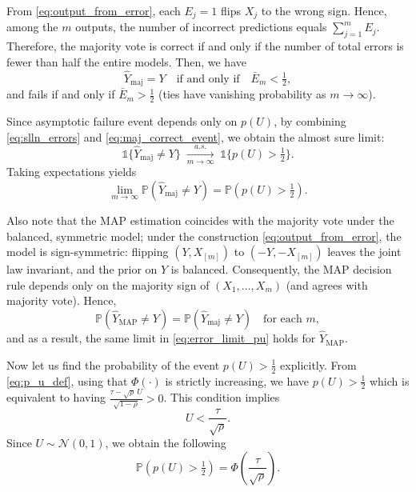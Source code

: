 \documentclass{article}
\theoremstyle{plain}
\theoremstyle{definition}
\theoremstyle{remark}
\begin{document}
From \eqref{eq:output_from_error}, each $E_j=1$ flips $X_j$ to the wrong sign.
Hence, among the $m$ outputs, the number of incorrect predictions equals $\sum_{j=1}^m E_j$.
Therefore, the majority vote is correct
if and only if  the number of total errors is fewer than half the entire models. Then, we have 
\begin{equation}
\label{eq:maj_correct_event}
\hat Y_{\mathrm{maj}} = Y
\quad\text{if and only if}\quad
\bar E_m < \tfrac12,
\end{equation}
and fails if and only if $\bar E_m>\tfrac12$ (ties have vanishing probability as $m\to\infty$).

Since asymptotic failure event depends only on $p(U)$, 
by combining \eqref{eq:slln_errors} and \eqref{eq:maj_correct_event}, we obtain the almost sure limit:
\begin{equation}
\label{eq:maj_limit_indicator}
\mathds{1}\{\hat Y_{\mathrm{maj}}\neq Y\}
\;\xrightarrow[m\to\infty]{a.s.}\;
\mathds{1}\{p(U)>\tfrac12\}.
\end{equation}
Taking expectations yields
\begin{equation}
\label{eq:error_limit_pu}
\lim_{m\to\infty}\mathbb{P}(\hat Y_{\mathrm{maj}}\neq Y)=\mathbb{P}\!\left(p(U)>\tfrac12\right).
\end{equation}

Also note that the MAP estimation coincides with the majority vote under the balanced, symmetric model;
under the construction \eqref{eq:output_from_error}, the model is sign-symmetric:
flipping $(Y,X_{[m]})$ to $(-Y,-X_{[m]})$ leaves the joint law invariant, and the prior on $Y$ is balanced.
Consequently, the MAP decision rule depends only on the majority sign of $(X_1,\dots,X_m)$
(and agrees with majority vote). Hence,
\begin{equation}
\label{eq:map_equals_maj}
\mathbb{P}(\hat Y_{\mathrm{MAP}}\neq Y)=\mathbb{P}(\hat Y_{\mathrm{maj}}\neq Y)\quad\text{for each }m,
\end{equation}
and as a result, the same limit in \eqref{eq:error_limit_pu} holds for $\hat Y_{\mathrm{MAP}}$.

Now let us  find the probability of the event $p(U)>\tfrac12$ explicitly.
From \eqref{eq:p_u_def}, using that $\Phi(\cdot)$ is strictly increasing, we have $p(U)>\tfrac12
$ which is equivalent to having $\frac{\tau-\sqrt{\rho}\,U}{\sqrt{1-\rho}}>0$. This condition implies
\[
U<\frac{\tau}{\sqrt{\rho}}.
\]
Since $U\sim\mathcal{N}(0,1)$, we obtain the following
\begin{equation}
\label{eq:error_floor_tau}
\mathbb{P}\!\left(p(U)>\tfrac12\right)=\Phi\!\left(\frac{\tau}{\sqrt{\rho}}\right).
\end{equation}
\end{document}
